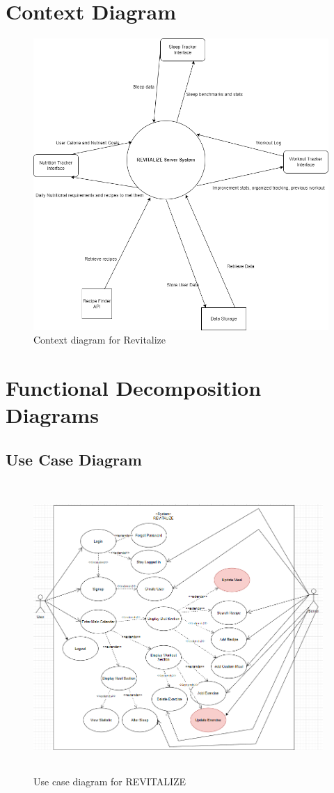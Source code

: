 \documentclass[12pt,letterpaper]{article}
\begin{document}
\section{Context Diagram}
\begin{figure}[H]
	\centering
	\includegraphics[scale=0.5]{cont_diag.png}
	\caption{\textcolor{black} Context diagram for Revitalize}
\end{figure}


\section{Functional Decomposition Diagrams}
\subsection{Use Case Diagram}
\begin{figure}[H]
	\centering
	\includegraphics[width=11cm, height=11cm]{4G06SRSUseCaseDiagram.png}
	\caption{Use case diagram for REVITALIZE}
\end{figure}
\end{document}
